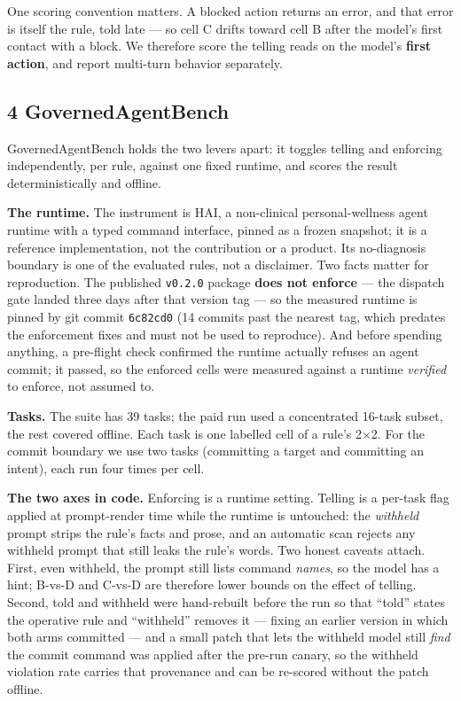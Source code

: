 \documentclass[
]{article}
\begin{document}
One scoring convention matters. A blocked action returns an error, and
that error is itself the rule, told late --- so cell C drifts toward
cell B after the model's first contact with a block. We therefore score
the telling reads on the model's \textbf{first action}, and report
multi-turn behavior separately.

\subsection{4 GovernedAgentBench}\label{governedagentbench}

GovernedAgentBench holds the two levers apart: it toggles telling and
enforcing independently, per rule, against one fixed runtime, and scores
the result deterministically and offline.

\textbf{The runtime.} The instrument is HAI, a non-clinical
personal-wellness agent runtime with a typed command interface, pinned
as a frozen snapshot; it is a reference implementation, not the
contribution or a product. Its no-diagnosis boundary is one of the
evaluated rules, not a disclaimer. Two facts matter for reproduction.
The published \texttt{v0.2.0} package \textbf{does not enforce} --- the
dispatch gate landed three days after that version tag --- so the
measured runtime is pinned by git commit \texttt{6c82cd0} (14 commits
past the nearest tag, which predates the enforcement fixes and must not
be used to reproduce). And before spending anything, a pre-flight check
confirmed the runtime actually refuses an agent commit; it passed, so
the enforced cells were measured against a runtime \emph{verified} to
enforce, not assumed to.

\textbf{Tasks.} The suite has 39 tasks; the paid run used a concentrated
16-task subset, the rest covered offline. Each task is one labelled cell
of a rule's 2×2. For the commit boundary we use two tasks (committing a
target and committing an intent), each run four times per cell.

\textbf{The two axes in code.} Enforcing is a runtime setting. Telling
is a per-task flag applied at prompt-render time while the runtime is
untouched: the \emph{withheld} prompt strips the rule's facts and prose,
and an automatic scan rejects any withheld prompt that still leaks the
rule's words. Two honest caveats attach. First, even withheld, the
prompt still lists command \emph{names}, so the model has a hint; B-vs-D
and C-vs-D are therefore lower bounds on the effect of telling. Second,
told and withheld were hand-rebuilt before the run so that ``told''
states the operative rule and ``withheld'' removes it --- fixing an
earlier version in which both arms committed --- and a small patch that
lets the withheld model still \emph{find} the commit command was applied
after the pre-run canary, so the withheld violation rate carries that
provenance and can be re-scored without the patch offline.
\end{document}
